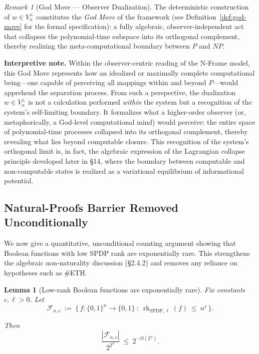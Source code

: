 \documentclass[12pt]{article}
\newtheorem{lemma}[theorem]{Lemma}
\theoremstyle{definition}
\theoremstyle{definition}
\theoremstyle{remark}
\newtheorem{remark}{Remark}
\theoremstyle{remark}
\begin{document}
\begin{remark}[God Move --- Observer Dualization]
The deterministic construction of $w\in V_n^{\perp}$ constitutes the \emph{God Move} of the framework (see Definition~\ref{def:god-move} for the formal specification): a fully algebraic, observer-independent act that collapses the polynomial-time subspace into its orthogonal complement, thereby realizing the meta-computational boundary between $P$ and $NP$.

\textbf{Interpretive note.}
Within the observer-centric reading of the N-Frame model, this God Move represents how an idealized or maximally complete computational being---one capable of perceiving all mappings within and beyond $P$---would apprehend the separation process.
From such a perspective, the dualization $w\in V_n^{\perp}$ is not a calculation performed \emph{within} the system but a recognition of the system's self-limiting boundary.
It formalizes what a higher-order observer (or, metaphorically, a God-level computational mind) would perceive: the entire space of polynomial-time processes collapsed into its orthogonal complement, thereby revealing what lies beyond computable closure.
This recognition of the system's orthogonal limit is, in fact, the algebraic expression of the Lagrangian collapse principle developed later in \S14, where the boundary between computable and non-computable states is realized as a variational equilibrium of informational potential.
\end{remark}

\subsection{Natural-Proofs Barrier Removed Unconditionally}
\label{subsec:natural-proofs-unconditional}

We now give a quantitative, unconditional counting argument showing that Boolean functions with low SPDP rank are exponentially rare. This strengthens the algebraic non-naturality discussion (\S2.4.2) and removes any reliance on hypotheses such as \#ETH.

\begin{lemma}[Low-rank Boolean functions are exponentially rare]\label{lem:tiny-density}
Fix constants $c,\ell>0$. Let
\[
\mathcal{F}_{n,c} \ :=\ \{\,f:\{0,1\}^n\to\{0,1\}\ :\ \operatorname{rk}_{\mathrm{SPDP},\ell}(f)\ \le\ n^c\,\}.
\]

Then
\[
\frac{|\mathcal{F}_{n,c}|}{2^{2^{n}}} \ \le\ 2^{-\Omega(2^{n})}.
\]
\end{lemma}
\end{document}
